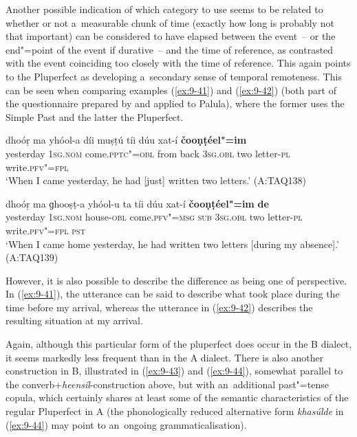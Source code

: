 Another possible indication of which category to use seems to be related to whether or not a~measurable chunk of time (exactly how long is probably not that important) can be considered to have elapsed between the event~-- or the end"=point of the event if durative~-- and the time of reference, as contrasted with the event coinciding too closely with the time of reference. This again points to the Pluperfect as developing a~secondary sense of temporal remoteness. This can be seen when comparing examples (\ref{ex:9-41}) and (\ref{ex:9-42}) (both part of the questionnaire prepared by \citet{dahl1985} and applied to Palula), where the former uses the Simple Past and the latter the Pluperfect.
\begin{exe}
\ex
\label{ex:9-41}
\gll dhoóṛ ma yhóol-a díi muṣṭú tíi dúu xat-í \textbf{čooṇṭéel"=im}\\
yesterday 1\textsc{sg.nom} come.\textsc{pptc"=obl} from back \textsc{3sg.obl} two letter-\textsc{pl} write.\textsc{pfv"=fpl}\\
\glt `When I came yesterday, he had [just] written two letters.' (A:TAQ138)

\ex
\label{ex:9-42}
\gll dhoóṛ ma ɡhooṣṭ-a yhóol-u ta tíi dúu xat-í \textbf{čooṇṭéel"=im} \textbf{de} \\
yesterday 1\textsc{sg.nom} house-\textsc{obl} come.\textsc{pfv"=msg}  \textsc{sub} \textsc{3sg.obl} two letter-\textsc{pl} write.\textsc{pfv"=fpl} \textsc{pst} \\
\glt `When I came home yesterday, he had written two letters [during my absence].' (A:TAQ139)
\end{exe}

However, it is also possible to describe the difference as being one of perspective. In (\ref{ex:9-41}), the utterance can be said to describe what took place during the time before my arrival, whereas the utterance in (\ref{ex:9-42}) describes the resulting situation at my arrival.


Again, although this particular form of the pluperfect does occur in the B dialect, it seems markedly less frequent than in the A dialect. There is also another construction in B, illustrated in (\ref{ex:9-43}) and (\ref{ex:9-44}), somewhat parallel to the converb+\textit{heensíl}-construction above, but with an~additional past"=tense copula, which certainly shares at least some of the semantic characteristics of the regular Pluperfect in A (the phonologically reduced alternative form \textit{khasúlde} in (\ref{ex:9-44}) may point to an~ongoing grammaticalisation).

